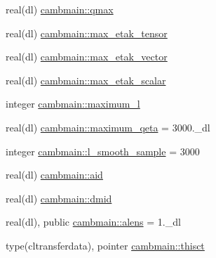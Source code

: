 \begin{DoxyCompactItemize}
\item 
real(dl) \mbox{\hyperlink{namespacecambmain_abb9b39e7c9db24515f7e239e94831b1b}{cambmain\+::qmax}}
\item 
real(dl) \mbox{\hyperlink{namespacecambmain_a16f888ec18bcb88fb88b604ee1c858de}{cambmain\+::max\+\_\+etak\+\_\+tensor}}
\item 
real(dl) \mbox{\hyperlink{namespacecambmain_a070e24f1ae1246e4d6b1ad8aacc87919}{cambmain\+::max\+\_\+etak\+\_\+vector}}
\item 
real(dl) \mbox{\hyperlink{namespacecambmain_ac4c24515e982e0af0ef3997027302e04}{cambmain\+::max\+\_\+etak\+\_\+scalar}}
\item 
integer \mbox{\hyperlink{namespacecambmain_acb0277d55c225aee4dcfca123a3631a2}{cambmain\+::maximum\+\_\+l}}
\item 
real(dl) \mbox{\hyperlink{namespacecambmain_a538fac0cbeacb9f2daa7bd638e3ca806}{cambmain\+::maximum\+\_\+qeta}} = 3000.\+\_\+dl
\item 
integer \mbox{\hyperlink{namespacecambmain_a3ebcb0843a6249a58a33f83e5cf9b73b}{cambmain\+::l\+\_\+smooth\+\_\+sample}} = 3000
\item 
real(dl) \mbox{\hyperlink{namespacecambmain_a75e3aaa48b8fb5985062a5be2f05dea8}{cambmain\+::aid}}
\item 
real(dl) \mbox{\hyperlink{namespacecambmain_a926ceb33a98900b90f263443b550e391}{cambmain\+::dmid}}
\item 
real(dl), public \mbox{\hyperlink{namespacecambmain_a5e84a7f00ba906908259607d54f9176f}{cambmain\+::alens}} = 1.\+\_\+dl
\item 
type(cltransferdata), pointer \mbox{\hyperlink{namespacecambmain_a48fb88bbacefa24534f688f9de4ff827}{cambmain\+::thisct}}
\end{DoxyCompactItemize}

